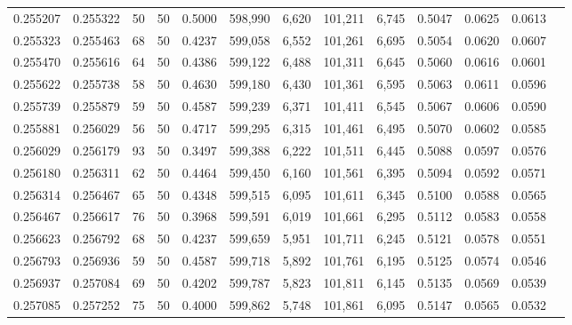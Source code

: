 \begin{tabular}{rrrrrrrrrrrrr}
0.255207 & 0.255322 &    50 &  50 &                                     0.5000 & 598,990 &   6,620 & 101,211 &   6,745 & 0.5047 & 0.0625 & 0.0613 \\
0.255323 & 0.255463 &    68 &  50 &                                     0.4237 & 599,058 &   6,552 & 101,261 &   6,695 & 0.5054 & 0.0620 & 0.0607 \\
0.255470 & 0.255616 &    64 &  50 &                                     0.4386 & 599,122 &   6,488 & 101,311 &   6,645 & 0.5060 & 0.0616 & 0.0601 \\
0.255622 & 0.255738 &    58 &  50 &                                     0.4630 & 599,180 &   6,430 & 101,361 &   6,595 & 0.5063 & 0.0611 & 0.0596 \\
0.255739 & 0.255879 &    59 &  50 &                                     0.4587 & 599,239 &   6,371 & 101,411 &   6,545 & 0.5067 & 0.0606 & 0.0590 \\
0.255881 & 0.256029 &    56 &  50 &                                     0.4717 & 599,295 &   6,315 & 101,461 &   6,495 & 0.5070 & 0.0602 & 0.0585 \\
0.256029 & 0.256179 &    93 &  50 &                                     0.3497 & 599,388 &   6,222 & 101,511 &   6,445 & 0.5088 & 0.0597 & 0.0576 \\
0.256180 & 0.256311 &    62 &  50 &                                     0.4464 & 599,450 &   6,160 & 101,561 &   6,395 & 0.5094 & 0.0592 & 0.0571 \\
0.256314 & 0.256467 &    65 &  50 &                                     0.4348 & 599,515 &   6,095 & 101,611 &   6,345 & 0.5100 & 0.0588 & 0.0565 \\
0.256467 & 0.256617 &    76 &  50 &                                     0.3968 & 599,591 &   6,019 & 101,661 &   6,295 & 0.5112 & 0.0583 & 0.0558 \\
0.256623 & 0.256792 &    68 &  50 &                                     0.4237 & 599,659 &   5,951 & 101,711 &   6,245 & 0.5121 & 0.0578 & 0.0551 \\
0.256793 & 0.256936 &    59 &  50 &                                     0.4587 & 599,718 &   5,892 & 101,761 &   6,195 & 0.5125 & 0.0574 & 0.0546 \\
0.256937 & 0.257084 &    69 &  50 &                                     0.4202 & 599,787 &   5,823 & 101,811 &   6,145 & 0.5135 & 0.0569 & 0.0539 \\
0.257085 & 0.257252 &    75 &  50 &                                     0.4000 & 599,862 &   5,748 & 101,861 &   6,095 & 0.5147 & 0.0565 & 0.0532 \\

\end{tabular}
